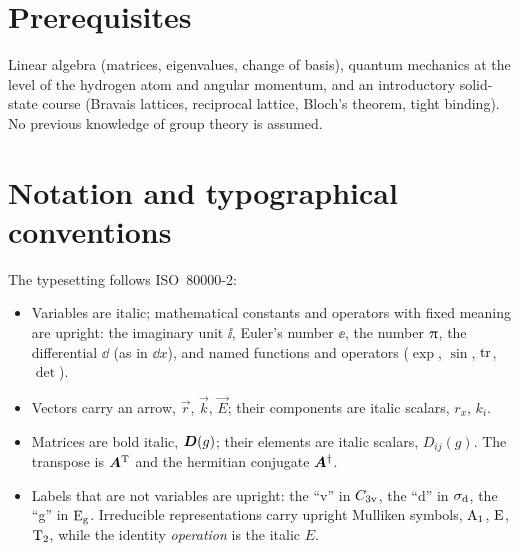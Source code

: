 \documentclass[11pt,openright]{book}
\begin{document}
\section*{Prerequisites}
Linear algebra (matrices, eigenvalues, change of basis), quantum mechanics at the
level of the hydrogen atom and angular momentum, and an introductory solid-state
course (Bravais lattices, reciprocal lattice, Bloch's theorem, tight binding).
No previous knowledge of group theory is assumed.

\section*{Notation and typographical conventions}
The typesetting follows ISO~80000-2:
\begin{itemize}
\item Variables are italic; mathematical constants and operators with fixed meaning
      are upright: the imaginary unit $\ii$, Euler's number $\ee$, the number $\uppi$,
      the differential $\dd$ (as in $\dd x$), and named functions and operators
      ($\exp$, $\sin$, $\operatorname{tr}$, $\det$).
\item Vectors carry an arrow, $\vec{r}$, $\vec{k}$, $\vec{E}$; their components are
      italic scalars, $r_x$, $k_i$.
\item Matrices are bold italic, $\bm{D}(g)$; their elements are italic scalars,
      $D_{ij}(g)$. The transpose is $\bm{A}^{\mathrm{T}}$ and the hermitian conjugate
      $\bm{A}^{\dagger}$.
\item Labels that are not variables are upright: the ``v'' in $C_{3\mathrm{v}}$, the ``d''
      in $\sigma_{\mathrm{d}}$, the ``g'' in $\mathrm{E}_{\mathrm{g}}$. Irreducible representations
      carry upright Mulliken symbols, $\mathrm{A}_1$, $\mathrm{E}$, $\mathrm{T}_2$, while the
      identity \emph{operation} is the italic $E$.
\end{itemize}
\end{document}

